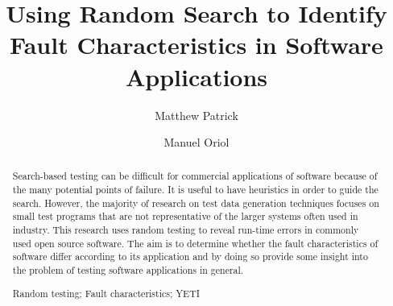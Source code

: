 \documentclass[runningheads,a4paper]{llncs}
\newcommand{\keywords}[1]{\par\addvspace\baselineskip
\noindent\keywordname\enspace\ignorespaces#1}
\begin{document}
\mainmatter  %

\title{Using Random Search to Identify Fault Characteristics in Software Applications}


%
%
\author{Matthew Patrick \and Manuel Oriol}
%


%
%

\maketitle


\begin{abstract}
Search-based testing can be difficult for commercial applications of software because of the many potential points of failure. It is useful to have heuristics in order to guide the search. However, the majority of research on test data generation techniques focuses on small test programs that are not representative of the larger systems often used in industry. This research uses random testing to reveal run-time errors in commonly used open source software. The aim is to determine whether the fault characteristics of software differ according to its application and by doing so provide some insight into the problem of testing software applications in general.
\keywords{Random testing; Fault characteristics; YETI}
\end{abstract}
\end{document}
